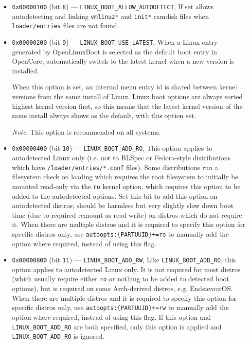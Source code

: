 \documentclass[]{article}
\begin{document}
\begin{itemize}
\begin{itemize}
    \item \texttt{0x00000100} (bit \texttt{8}) --- \texttt{LINUX\_BOOT\_ALLOW\_AUTODETECT},
    If set allows autodetecting and linking \texttt{vmlinuz*} and \texttt{init*} ramdisk files
    when \texttt{loader/entries} files are not found.
    \item \texttt{0x00000200} (bit \texttt{9}) --- \texttt{LINUX\_BOOT\_USE\_LATEST},
    When a Linux entry generated by OpenLinuxBoot is selected as the default boot entry
    in OpenCore, automatically switch to the latest kernel when a new version is installed. \medskip

    When this option is set, an internal menu entry id is shared between kernel versions from the same install
    of Linux. Linux boot options are always sorted highest kernel version first, so this means that
    the latest kernel version of the same install always shows as the default, with this option set. \medskip

    \emph{Note}: This option is recommended on all systems. \medskip

    \item \texttt{0x00000400} (bit \texttt{10}) --- \texttt{LINUX\_BOOT\_ADD\_RO},
    This option applies to autodetected Linux only (i.e. not to BLSpec or
    Fedora-style distributions which have \texttt{/loader/entries/*.conf} files).
    Some distributions run a filesystem check on loading which requires the root
    filesystem to initially be mounted read-only via the \texttt{ro} kernel option, which requires this
    option to be added to the autodetected options. Set this bit to add this
    option on autodetected distros; should be harmless but very slightly slow down boot time (due to required
    remount as read-write) on distros which do not require it.
    When there are multiple distros and it is required to specify this option for specific distros only, use
    \texttt{autoopts:\{PARTUUID\}+=ro} to manually add the option where required, instead of using this flag.

    \item \texttt{0x00000800} (bit \texttt{11}) --- \texttt{LINUX\_BOOT\_ADD\_RW},
    Like \texttt{LINUX\_BOOT\_ADD\_RO}, this option applies to autodetected Linux only. It is not
    required for most distros (which usually require either \texttt{ro} or nothing to be added to
    detected boot options), but is required on some Arch-derived distros, e.g. EndeavourOS.
    When there are multiple distros and it is required to specify this option for specific distros only, use
    \texttt{autoopts:\{PARTUUID\}+=rw} to manually add the option where required, instead of using this flag.
    If this option and \texttt{LINUX\_BOOT\_ADD\_RO} are both specified, only this option is applied
    and \texttt{LINUX\_BOOT\_ADD\_RO} is ignored.


\end{itemize}
\end{itemize}
\end{document}
